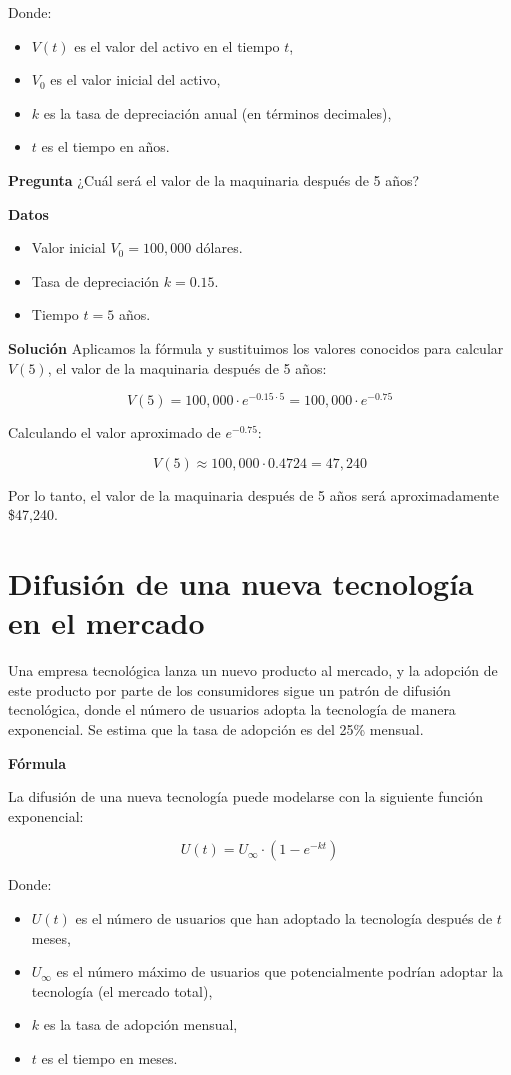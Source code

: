 \documentclass{article}
\begin{document}
Donde:
\begin{itemize}
    \item \( V(t) \) es el valor del activo en el tiempo \( t \),
    \item \( V_0 \) es el valor inicial del activo,
    \item \( k \) es la tasa de depreciación anual (en términos decimales),
    \item \( t \) es el tiempo en años.
\end{itemize}

\textbf{Pregunta}
¿Cuál será el valor de la maquinaria después de 5 años?

\textbf{Datos}
\begin{itemize}
    \item Valor inicial \( V_0 = 100,000 \) dólares.
    \item Tasa de depreciación \( k = 0.15 \).
    \item Tiempo \( t = 5 \) años.
\end{itemize}

\textbf{Solución}
Aplicamos la fórmula y sustituimos los valores conocidos para calcular \( V(5) \), el valor de la maquinaria después de 5 años:

\[
V(5) = 100,000 \cdot e^{-0.15 \cdot 5} = 100,000 \cdot e^{-0.75}
\]

Calculando el valor aproximado de \( e^{-0.75} \):

\[
V(5) \approx 100,000 \cdot 0.4724 = 47,240
\]

Por lo tanto, el valor de la maquinaria después de 5 años será aproximadamente \$47,240.

\section{Difusión de una nueva tecnología en el mercado}

Una empresa tecnológica lanza un nuevo producto al mercado, y la adopción de este producto por parte de los consumidores sigue un patrón de difusión tecnológica, donde el número de usuarios adopta la tecnología de manera exponencial. Se estima que la tasa de adopción es del 25\% mensual.

\textbf{Fórmula}

La difusión de una nueva tecnología puede modelarse con la siguiente función exponencial:

\[
U(t) = U_{\infty} \cdot \left(1 - e^{-kt}\right)
\]

Donde:
\begin{itemize}
    \item \( U(t) \) es el número de usuarios que han adoptado la tecnología después de \( t \) meses,
    \item \( U_{\infty} \) es el número máximo de usuarios que potencialmente podrían adoptar la tecnología (el mercado total),
    \item \( k \) es la tasa de adopción mensual,
    \item \( t \) es el tiempo en meses.
\end{itemize}
\end{document}
